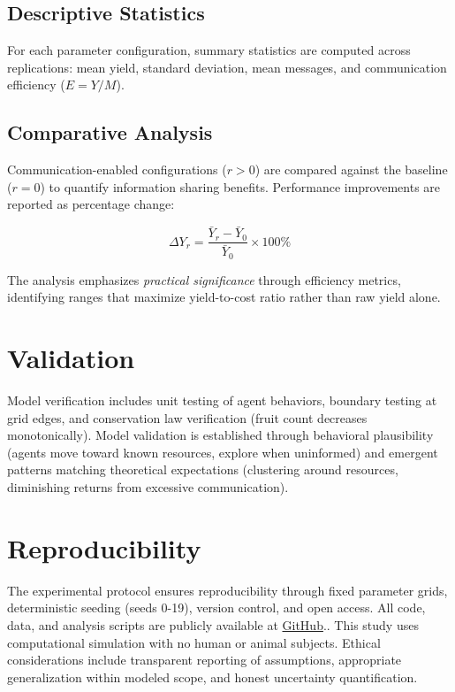 \subsection{Descriptive Statistics}

For each parameter configuration, summary statistics are computed across replications: mean yield, standard deviation, mean messages, and communication efficiency ($E = Y / M$).

\subsection{Comparative Analysis}

Communication-enabled configurations ($r > 0$) are compared against the baseline ($r = 0$) to quantify information sharing benefits. Performance improvements are reported as percentage change:

\begin{equation}
\Delta Y_r = \frac{\bar{Y}_r - \bar{Y}_0}{\bar{Y}_0} \times 100\%
\end{equation}

The analysis emphasizes \emph{practical significance} through efficiency metrics, identifying ranges that maximize yield-to-cost ratio rather than raw yield alone.

\section{Validation}

Model verification includes unit testing of agent behaviors, boundary testing at grid edges, and conservation law verification (fruit count decreases monotonically). Model validation is established through behavioral plausibility (agents move toward known resources, explore when uninformed) and emergent patterns matching theoretical expectations (clustering around resources, diminishing returns from excessive communication).

\section{Reproducibility}

The experimental protocol ensures reproducibility through fixed parameter grids, deterministic seeding (seeds 0-19), version control, and open access. All code, data, and analysis scripts are publicly available at \href{https://github.com/marufdevops/multiagent-cooperation-research}{GitHub}.. This study uses computational simulation with no human or animal subjects. Ethical considerations include transparent reporting of assumptions, appropriate generalization within modeled scope, and honest uncertainty quantification.

